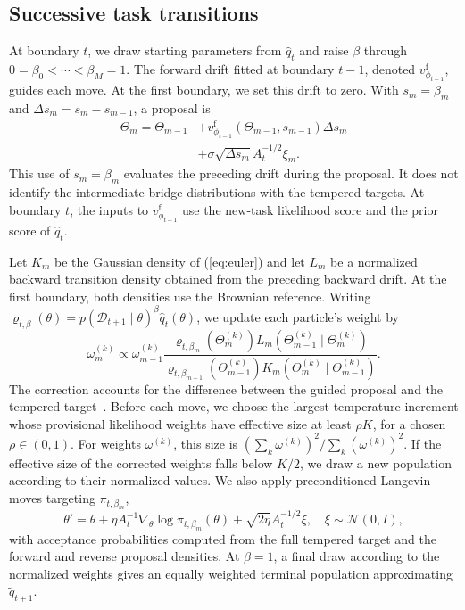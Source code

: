 \subsection{Successive task transitions}
\label{sec:transition}

At boundary $t$, we draw starting parameters from $\hat q_t$ and raise
$\beta$ through $0=\beta_0<\cdots<\beta_M=1$. The forward drift fitted
at boundary $t-1$, denoted $v^{\mathrm f}_{\phi_{t-1}}$, guides each move.
At the first boundary, we set this drift to zero. With
$s_m=\beta_m$ and $\Delta s_m=s_m-s_{m-1}$, a proposal is
\begin{equation}
\begin{split}
    \Theta_m=\Theta_{m-1}
    &+v^{\mathrm f}_{\phi_{t-1}}(\Theta_{m-1},s_{m-1})\Delta s_m\\
    &+\sigma\sqrt{\Delta s_m}A_t^{-1/2}\xi_m.
\end{split}
    \label{eq:euler}
\end{equation}
This use of $s_m=\beta_m$ evaluates the preceding drift during the
proposal. It does not identify the intermediate bridge distributions
with the tempered targets. At boundary $t$, the inputs to
$v^{\mathrm f}_{\phi_{t-1}}$ use the new-task likelihood score and the
prior score of $\hat q_t$.

Let $K_m$ be the Gaussian density of (\ref{eq:euler}) and let $L_m$ be a
normalized backward transition density obtained from the preceding
backward drift. At the first boundary, both densities use the Brownian
reference. Writing
$\varrho_{t,\beta}(\theta)=p(\mathcal{D}_{t+1}\mid\theta)^\beta
\hat q_t(\theta)$, we update each particle's weight by
\begin{equation}
    \omega_m^{(k)}\propto\omega_{m-1}^{(k)}
    \frac{\varrho_{t,\beta_m}(\Theta_m^{(k)})
    L_m(\Theta_{m-1}^{(k)}\mid\Theta_m^{(k)})}
    {\varrho_{t,\beta_{m-1}}(\Theta_{m-1}^{(k)})
    K_m(\Theta_m^{(k)}\mid\Theta_{m-1}^{(k)})}.
    \label{eq:bridgeweight}
\end{equation}
The correction accounts for the difference between the guided proposal
and the tempered target~\cite{delmoral2006smc}. Before each move, we
choose the largest temperature increment whose provisional likelihood
weights have effective size at least $\rho K$, for a chosen
$\rho\in(0,1)$. For weights $\omega^{(k)}$,
this size is $(\sum_k\omega^{(k)})^2/\sum_k(\omega^{(k)})^2$.
If the effective size of the corrected weights falls below $K/2$, we
draw a new population according to their normalized values. We also apply
preconditioned Langevin moves targeting
$\pi_{t,\beta_m}$,
\begin{equation}
    \theta'=\theta+\eta A_t^{-1}
    \nabla_\theta\log\pi_{t,\beta_m}(\theta)
    +\sqrt{2\eta}A_t^{-1/2}\xi,
    \quad\xi\sim\mathcal{N}(0,I),
    \label{eq:mala}
\end{equation}
with acceptance probabilities computed from the full tempered target
and the forward and reverse proposal densities. At $\beta=1$, a final
draw according to the normalized weights gives an equally weighted
terminal population approximating $\tilde q_{t+1}$.

